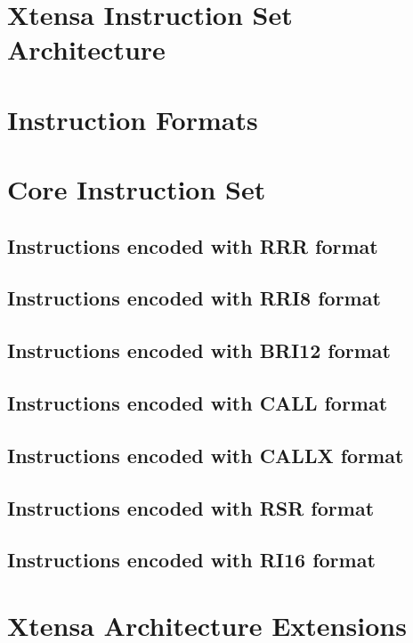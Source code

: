 \documentclass[oneside,11pt]{book}
\begin{document}
	
\chapter*{Xtensa Instruction Set Architecture}



\chapter*{Instruction Formats}



\chapter*{Core Instruction Set}

\section*{Instructions encoded with RRR format}

\newpage
\section*{Instructions encoded with RRI8 format}

\newpage
\section*{Instructions encoded with BRI12 format}

\newpage
\section*{Instructions encoded with CALL format}

\section*{Instructions encoded with CALLX format}

\newpage
\section*{Instructions encoded with RSR format}

\section*{Instructions encoded with RI16 format}


\newpage
\chapter*{Xtensa Architecture Extensions}
\end{document}

